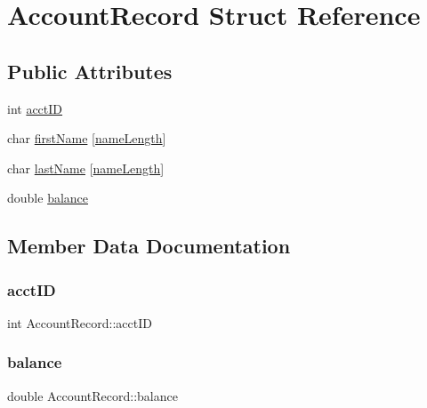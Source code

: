 \hypertarget{struct_account_record}{}\section{Account\+Record Struct Reference}
\label{struct_account_record}
\subsection*{Public Attributes}
\begin{DoxyCompactItemize}
\item 
int \hyperlink{struct_account_record_a587aa92adcd387d37427cd19c69e5932}{acct\+ID}
\item 
char \hyperlink{struct_account_record_a89df48cc152b78efda9060a0cc461dd1}{first\+Name} \mbox{[}\hyperlink{database_8cpp_a5d9687231dabb10b55cd7598e1be6702}{name\+Length}\mbox{]}
\item 
char \hyperlink{struct_account_record_ab9b4c37852573096dd9c81bec70f68b9}{last\+Name} \mbox{[}\hyperlink{database_8cpp_a5d9687231dabb10b55cd7598e1be6702}{name\+Length}\mbox{]}
\item 
double \hyperlink{struct_account_record_a7de857c68a45702a0c1c4720b4570c2a}{balance}
\end{DoxyCompactItemize}


\subsection{Member Data Documentation}
\hypertarget{struct_account_record_a587aa92adcd387d37427cd19c69e5932}{}\label{struct_account_record_a587aa92adcd387d37427cd19c69e5932} 
\subsubsection{\texorpdfstring{acct\+ID}{acctID}}
{\footnotesize\ttfamily int Account\+Record\+::acct\+ID}

\hypertarget{struct_account_record_a7de857c68a45702a0c1c4720b4570c2a}{}\label{struct_account_record_a7de857c68a45702a0c1c4720b4570c2a} 
\subsubsection{\texorpdfstring{balance}{balance}}
{\footnotesize\ttfamily double Account\+Record\+::balance}

